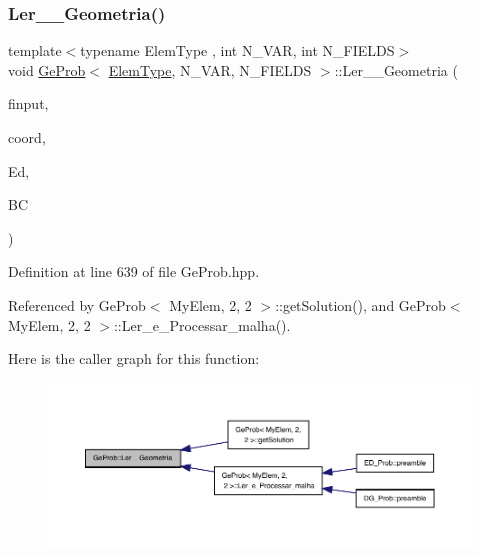 \subsubsection{\texorpdfstring{Ler\+\_\+\+\_\+\+Geometria()}{Ler\_\_Geometria()}}
{\footnotesize\ttfamily template$<$typename Elem\+Type , int N\+\_\+\+V\+AR, int N\+\_\+\+F\+I\+E\+L\+DS$>$ \\
void \hyperlink{classGeProb}{Ge\+Prob}$<$ \hyperlink{spectral_8h_aaa2c1a7b2d1b12c590d730fe6ac839fa}{Elem\+Type}, N\+\_\+\+V\+AR, N\+\_\+\+F\+I\+E\+L\+DS $>$\+::Ler\+\_\+\+\_\+\+Geometria (\begin{DoxyParamCaption}\item[{F\+I\+LE $\ast$}]{finput,  }\item[{double $\ast$}]{coord,  }\item[{int $\ast$}]{Ed,  }\item[{int $\ast$}]{BC }\end{DoxyParamCaption})}



Definition at line 639 of file Ge\+Prob.\+hpp.



Referenced by Ge\+Prob$<$ My\+Elem, 2, 2 $>$\+::get\+Solution(), and Ge\+Prob$<$ My\+Elem, 2, 2 $>$\+::\+Ler\+\_\+e\+\_\+\+Processar\+\_\+malha().

Here is the caller graph for this function\+:
\nopagebreak
\begin{figure}[H]
\begin{center}
\leavevmode
\includegraphics[width=350pt]{classGeProb_a1b1545b917023458df409bd97573bac5_icgraph}
\end{center}
\end{figure}
\mbox{\label{classGeProb_ac1030cadfbc0d88e817617a927dbc31f}} 
